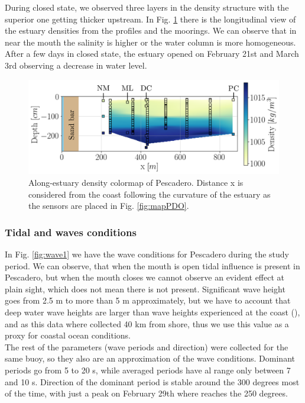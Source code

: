 \documentclass[11pt,letterpaper]{article}
\begin{document}
During closed state, we observed three layers in the density structure with the superior one getting thicker upstream. In Fig. \ref{fig:perfiles1} there is the longitudinal view of the estuary densities from the profiles and the moorings. We can observe that in near the mouth the salinity is higher or the water column is more homogeneous. After a few days in closed state, the estuary opened on February 21st and March 3rd observing a decrease in water level. \\

\begin{figure}[h!]
    \centering
    \includegraphics[scale=0.6]{Imagenes/vista_long2.png}
    \caption{Along-estuary density colormap of Pescadero. Distance x is considered from the coast following the curvature of the estuary as the sensors are placed in Fig. \ref{fig:mapPDO}. }
    \label{fig:perfiles1}
\end{figure}

\subsubsection{Tidal and waves conditions}

In Fig. \ref{fig:wave1} we have the wave conditions for Pescadero during the study period. We can observe, that when the mouth is open tidal influence is present in Pescadero, but when the mouth closes we cannot observe an evident effect at plain sight, which does not mean there is not present. Significant wave height goes from 2.5 m to more than 5 m approximately, but we have to account that deep water wave heights are larger than wave heights experienced at the coast (\cite{Williams2014}), and as this data where collected 40 km from shore, thus we use this value as a proxy for coastal ocean conditions.  \\

The rest of the parameters (wave periods and direction) were collected for the same buoy, so they also are an approximation of the wave conditions. Dominant periods go from 5 to 20 s, while averaged periods have al range only between 7 and 10 s. Direction of the dominant period is stable around the 300 degrees most of the time, with just a peak on February 29th where reaches the 250 degrees.\\
\end{document}
